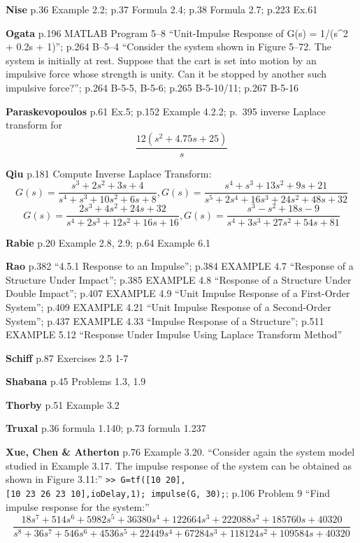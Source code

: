 \documentclass[
  11pt,
]{article}
\begin{document}
\textbf{Nise} p.36 Example 2.2; p.37 Formula 2.4; p.38 Formula 2.7;
p.223 Ex.61

\textbf{Ogata} p.196 MATLAB Program 5--8 ``Unit-Impulse Response of G(s)
= 1/(s\^{}2 + 0.2s + 1)''; p.264 B--5--4 ``Consider the system shown in
Figure 5--72. The system is initially at rest. Suppose that the cart is
set into motion by an impulsive force whose strength is unity. Can it be
stopped by another such impulsive force?''; p.264 B-5-5, B-5-6; p.265
B-5-10/11; p.267 B-5-16

\textbf{Paraskevopoulos} p.61 Ex.5; p.152 Example 4.2.2; p.~395 inverse
Laplace transform for \[\frac{12(s^2 + 4.75s + 25)}{s}\]

\textbf{Qiu} p.181 Compute Inverse Laplace Transform:
\[G(s) = \frac{s^3 + 2s^2 + 3s + 4}{s^4 + s^3 + 10s^2 + 6s + 8}, G(s) = \frac{s^4 + s^3 + 13s^2 + 9s + 21}{s^5 + 2s^4 + 16s^3 + 24s^2 + 48s + 32}\]
\[G(s) = \frac{2s^3 + 4s^2 + 24s + 32}{s^4 + 2s^3 + 12s^2 + 16s + 16}, G(s) = \frac{s^3 - s^2 + 18s - 9}{s^4 + 3s^3 + 27s^2 + 54s + 81}\]

\textbf{Rabie} p.20 Example 2.8, 2.9; p.64 Example 6.1

\textbf{Rao} p.382 ``4.5.1 Response to an Impulse''; p.384 EXAMPLE 4.7
``Response of a Structure Under Impact''; p.385 EXAMPLE 4.8 ``Response
of a Structure Under Double Impact''; p.407 EXAMPLE 4.9 ``Unit Impulse
Response of a First-Order System''; p.409 EXAMPLE 4.21 ``Unit Impulse
Response of a Second-Order System''; p.437 EXAMPLE 4.33 ``Impulse
Response of a Structure''; p.511 EXAMPLE 5.12 ``Response Under Impulse
Using Laplace Transform Method''

\textbf{Schiff} p.87 Exercises 2.5 1-7

\textbf{Shabana} p.45 Problems 1.3, 1.9

\textbf{Thorby} p.51 Example 3.2

\textbf{Truxal} p.36 formula 1.140; p.73 formula 1.237

\textbf{Xue, Chen \& Atherton} p.76 Example 3.20. ``Consider again the
system model studied in Example 3.17. The impulse response of the system
can be obtained as shown in Figure 3.11:''
\texttt{\textgreater{}\textgreater{}\ G=tf({[}10\ 20{]},{[}10\ 23\ 26\ 23\ 10{]},\textquotesingle{}ioDelay\textquotesingle{},1);\ impulse(G,\ 30);};
p.106 Problem 9 ``Find impulse response for the system:''
\[\frac{18s^7 + 514s^6 + 5982s^5 + 36380s^4 + 122664s^3 + 222088s^2 + 185760s + 40320}{s^8 + 36s^7 + 546s^6 + 4536s^5 + 22449s^4 + 67284s^3 + 118124s^2 + 109584s + 40320}\]
\end{document}
